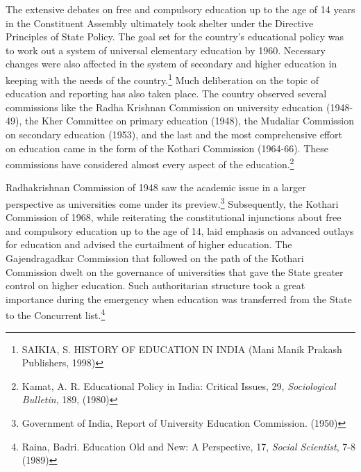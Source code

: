 \begin{multicols}{2}
\noi
The extensive debates on free and compulsory education up to the age of 14 years in the
Constituent Assembly ultimately took shelter under the Directive Principles of State Policy.
The goal set for the country’s educational policy was to work out a system of universal
elementary education by 1960. Necessary changes were also affected in the system of
secondary and higher education in keeping with the needs of the country.\footnote{SAIKIA, S. HISTORY OF EDUCATION IN INDIA (Mani Manik Prakash Publishers, 1998)} Much deliberation
on the topic of education and reporting has also taken place. The country observed several
commissions like the Radha Krishnan Commission on university education (1948-49), the
Kher Committee on primary education (1948), the Mudaliar Commission on secondary
education (1953), and the last and the most comprehensive effort on education came in the
form of the Kothari Commission (1964-66). These commissions have considered almost
every aspect of the education.\footnote{Kamat, A. R. Educational Policy in India: Critical Issues, 29, \textit{Sociological Bulletin}, 189, (1980)}

\vspace{-.15cm}

\noi
Radhakrishnan Commission of 1948 saw the academic issue in a larger perspective as
universities come under its preview.\footnote{Government of India, Report of University Education Commission. (1950)} Subsequently, the Kothari Commission of 1968, while
reiterating the constitutional injunctions about free and compulsory education up to the age of
14, laid emphasis on advanced outlays for education and advised the curtailment of higher
education. The Gajendragadkar Commission that followed on the path of the Kothari
Commission dwelt on the governance of universities that gave the State greater control on
higher education. Such authoritarian structure took a great importance during the emergency
when education was transferred from the State to the Concurrent list.\footnote{ Raina, Badri. Education Old and New: A Perspective, 17, \textit{Social Scientist}, 7-8 (1989)}

\vspace{-.15cm}


\end{multicols}
